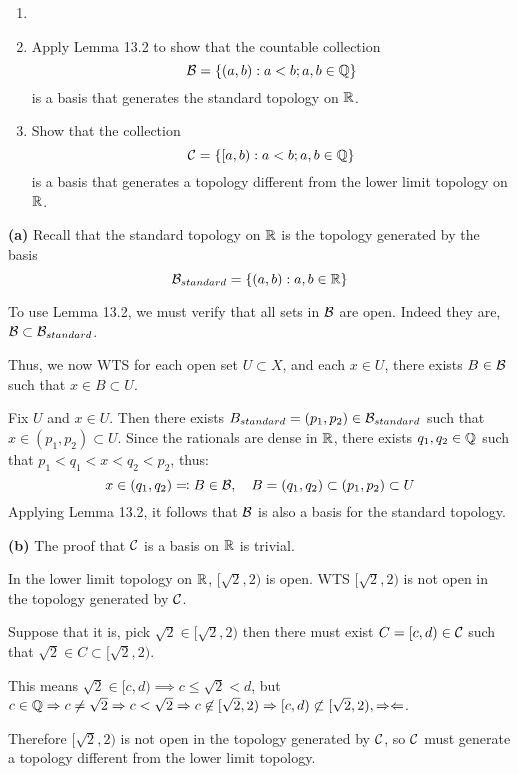 \documentclass[a4paper, 12pt]{article}
\begin{document}
\begin{problem} 
\begin{enumerate}
\item []
\item Apply Lemma 13.2 to show that the countable collection \begin{equation*}
\mathcal{B} = \{(a, b) : a < b; a, b \in \mathbb{Q}\}
\end{equation*}
is a basis that generates the standard topology on $\mathbb{R}$.
\item Show that the collection \begin{equation*}
\mathcal{C} = \{[a, b) : a < b; a, b \in \mathbb{Q}\}
\end{equation*}
is a basis that generates a topology different from the lower limit topology on $\mathbb{R}$.
\end{enumerate}
\end{problem}
\begin{solution}
    \textbf{(a)} 
    Recall that the standard topology on $\mathbb{R}$ is the topology generated by the basis \begin{equation*}
    \mathcal{B}_{standard} = \{(a, b) : a, b \in \mathbb{R}\}
    \end{equation*}
    
    To use Lemma 13.2, we must verify that all sets in $\mathcal{B}$ are open. Indeed they are, $\mathcal{B} \subset \mathcal{B}_{standard}$.

    Thus, we now WTS for each open set $U \subset X$, and each $x \in U$, there exists $B \in \mathcal{B}$ such that $x \in B \subset U$.

    Fix $U$ and $x \in U$. Then there exists $B_{standard} = (p_1, p_2) \in \mathcal{B}_{standard}$ such that $x \in (p_1, p_2) \subset U$. Since the rationals are dense in $\mathbb{R}$, there exists $q_1, q_2 \in \mathbb{Q}$ such that $p_1 < q_1 < x < q_2 < p_2$, thus: \begin{equation*}
    x \in (q_1, q_2) \eqqcolon B \in \mathcal{B}, \quad B = (q_1, q_2) \subset (p_1, p_2) \subset U
    \end{equation*}
    Applying Lemma 13.2, it follows that $\mathcal{B}$ is also a basis for the standard topology.

    \textbf{(b)} 
    The proof that $\mathcal{C}$ is a basis on $\mathbb{R}$ is trivial.

    In the lower limit topology on $\mathbb{R}$, $[\sqrt{2}, 2)$ is open. WTS $[\sqrt{2}, 2)$ is not open in the topology generated by $\mathcal{C}$.

    Suppose that it is, pick $\sqrt{2} \in [\sqrt{2}, 2)$ then there must exist $C = [c, d) \in \mathcal{C}$ such that $\sqrt{2} \in C \subset [\sqrt{2}, 2)$.
    
    This means $\sqrt{2} \in [c, d) \implies c \leq \sqrt{2} < d$, but $c \in \mathbb{Q} \Rightarrow c \neq \sqrt{2} \Rightarrow c < \sqrt{2} \Rightarrow c \not \in [\sqrt{2}, 2) \Rightarrow [c, d) \not \subset [\sqrt{2}, 2), \Rightarrow\Leftarrow$.

    Therefore $[\sqrt{2}, 2)$ is not open in the topology generated by $\mathcal{C}$, so $\mathcal{C}$ must generate a topology different from the lower limit topology.
\end{solution}
\end{document}
